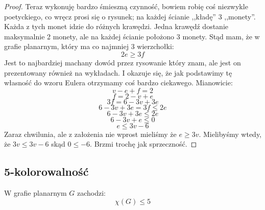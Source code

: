 \begin{proof}
        Teraz wykonuję bardzo śmieszną czynność, bowiem robię coś niezwykle poetyckiego, co wręcz prosi się o rysunek; na każdej ścianie ,,kładę'' 3 ,,monety''. Każda z tych monet idzie do różnych krawędzi. Jedna krawędź dostanie maksymalnie 2 monety, ale na każdej ścianie położono 3 monety. Stąd mam, że w grafie planarnym, który ma co najmniej 3 wierzchołki:
        \begin{equation*}
            2e \geq 3f
        \end{equation*}
        Jest to najbardziej machany dowód przez rysowanie który znam, ale jest on prezentowany również na wykładach. I okazuje się, że jak podstawimy tę własność do wzoru Eulera otrzymamy coś bardzo ciekawego. Mianowicie:
        \begin{equation*}
            v - e + f = 2
        \end{equation*}
        \begin{equation*}
            f = 2 - v + e
        \end{equation*}
        \begin{equation*}
           3f = 6 - 3v + 3e
        \end{equation*}
        \begin{equation*}
            6 - 3v + 3e = 3f \leq 2e
        \end{equation*}
         \begin{equation*}
            6 - 3v + 3e \leq 2e
        \end{equation*}
        \begin{equation*}
            6 - 3v + e \leq 0
        \end{equation*}
        \begin{equation*}
            e \leq 3v - 6
        \end{equation*}
        Zaraz chwilunia, ale z założenia nie wprost mieliśmy że $e \geq 3v$. Mielibyśmy wtedy, że $3v \leq 3v-6$ skąd $0 \leq -6$. Brzmi trochę jak sprzeczność. 
    \end{proof}
    
        \subsection{5-kolorowalność}
        \begin{theorem}
            W grafie planarnym $G$ zachodzi:
            \begin{equation}
                \chi(G) \leq 5
            \end{equation}
        \end{theorem}


